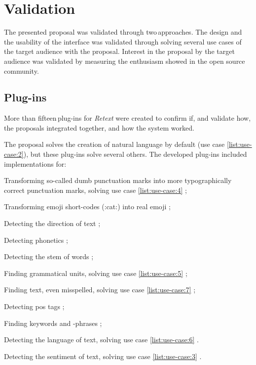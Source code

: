 \chapter{Validation}\label{validation}

The presented proposal was validated through two\,approaches.
The design and the usability of the interface was validated through
  solving several use cases of the target audience with the proposal.
Interest in the proposal by the target audience was validated by
  measuring the enthusiasm showed in the open source community.

\section{Plug-ins}\label{plugins}

More than fifteen\,plug-ins for \emph{Retext} were created to confirm if,
  and validate how, the proposals integrated together, and how the system
  worked.

The proposal solves the creation of natural language by default (use case
  \ref{list:use-case:2}), but these plug-ins solve several others.
The developed plug-ins included implementations for:

\begin{aenumerate}
\item Transforming so-called dumb punctuation marks into more
  typographically correct punctuation marks, solving use case
  \ref{list:use-case:4} \autocite*{wooorm/retext-smartypants-source-code};
\item Transforming emoji short-codes (:cat:) into real emoji
  \autocite*{wooorm/retext-emoji-source-code};
\item Detecting the direction of text
  \autocite*{wooorm/retext-directionality-source-code};
\item Detecting phonetics
  \autocite*{wooorm/retext-double-metaphone-source-code};
\item Detecting the stem of words
  \autocite*{wooorm/retext-porter-stemmer-source-code};
\item Finding grammatical units, solving use case
  \ref{list:use-case:5}  \autocite*{wooorm/retext-visit-source-code};
\item Finding text, even misspelled, solving use case
  \ref{list:use-case:7} \autocite*{wooorm/retext-search-source-code};
\item Detecting \gls{pos} tags \autocite*{wooorm/retext-pos-source-code};
\item Finding keywords and -phrases
  \autocite*{wooorm/retext-keywords-source-code};
\item Detecting the language of text, solving use case \ref{list:use-case:6}
  \autocite*{wooorm/retext-language-source-code}.
\item Detecting the sentiment of text, solving use case \ref{list:use-case:3}
  \autocite*{wooorm/retext-sentiment-source-code}.
\end{aenumerate}

